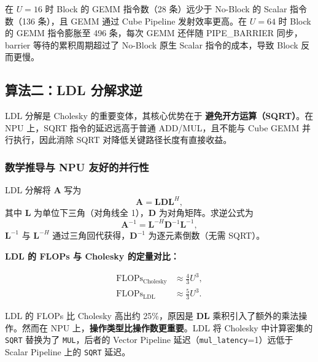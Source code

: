 \documentclass{CjC}
\begin{document}
    在 $U=16$ 时 Block 的 GEMM 指令数（28 条）远少于 No-Block 的 Scalar 指令数（136
    条），且 GEMM 通过 Cube Pipeline 发射效率更高。在 $U=64$ 时 Block 的 GEMM 指令膨胀至
    496 条，每次 GEMM 还伴随 PIPE\_BARRIER 同步，barrier 等待的累积周期超过了 No-Block
    原生 Scalar 指令的成本，导致 Block 反而更慢。

    \subsection{算法二：LDL 分解求逆}
    \label{sec:ldl}

    LDL 分解是 Cholesky 的重要变体，其核心优势在于 \textbf{避免开方运算（SQRT）}。在
    NPU 上，SQRT 指令的延迟远高于普通 ADD/MUL，且不能与 Cube GEMM 并行执行，因此消除
    SQRT 对降低关键路径长度有直接收益。

    \subsubsection{数学推导与 NPU 友好的并行性}

    LDL 分解将 $\bm{A}$ 写为
    \begin{equation}
        \bm{A}=\bm{L}\bm{D}\bm{L}^{H},
    \end{equation}
    其中 $\bm{L}$ 为单位下三角（对角线全 1），$\bm{D}$ 为对角矩阵。求逆公式为
    \begin{equation}
        \bm{A}^{-1}=\bm{L}^{-H}\bm{D}^{-1}\bm{L}^{-1},
    \end{equation}
    $\bm{L}^{-1}$ 与 $\bm{L}^{-H}$ 通过三角回代获得，$\bm{D}^{-1}$ 为逐元素倒数（无需
    SQRT）。

    \textbf{LDL 的 FLOPs 与 Cholesky 的定量对比：}

    \begin{equation}
        \begin{aligned}
            \text{FLOPs}_{\text{Cholesky}} & \approx \frac{4}{3}U^{3}, \\
            \text{FLOPs}_{\text{LDL}}      & \approx \frac{5}{3}U^{3}.
        \end{aligned}
    \end{equation}

    LDL 的 FLOPs 比 Cholesky 高出约 25\%，原因是 $\bm{DL}$ 乘积引入了额外的乘法操作。然而在
    NPU 上，\textbf{操作类型比操作数更重要}。LDL 将 Cholesky 中计算密集的
    \texttt{SQRT} 替换为了 \texttt{MUL}，后者的 Vector Pipeline 延迟（\texttt{mul\_latency}=1）远低于
    Scalar Pipeline 上的 \texttt{SQRT} 延迟。
\end{document}
